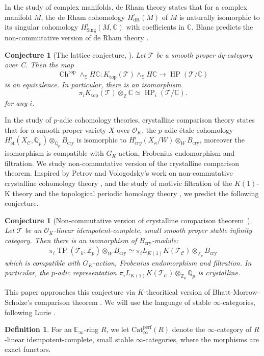 \documentclass[11pt]{amsart}
\newcommand{\bC}{\mathbb{C}}
\newcommand{\Q}{\mathbb{Q}}
\newcommand{\Z}{\mathbb{Z}}
\newcommand{\sC}{\mathcal{C}}
\newcommand{\sO}{\mathcal{O}}
\newcommand{\sT}{\mathcal{T}}
\newcommand{\bS}{\mathbb{S}}
\newcommand{\LK}{{L_{K(1)}}}
\newcommand{\TP}{\operatorname{TP}}
\newcommand{\HP}{\operatorname{HP}}
\newcommand{\et}{{\operatorname{\acute{e}t}}}
\newcommand{\Bcry}{B_{\operatorname{cry}}}
\newcommand{\Cat}{\operatorname{Cat_{\infty}^{perf}}}
\newtheorem{conj}[lemma]{Conjecture}
\theoremstyle{definition}
\newtheorem{defn}[lemma]{Definition}
\theoremstyle{remark}
\numberwithin{equation}{section}
\begin{document}
 In the study of complex manifolds, de Rham theory states that for a complex manifold $M$, the de Rham cohomology $H^i_{\text{dR}}(M)$ of $M$ is naturally isomorphic to its singular cohomology $H^i_{\text{Sing}}(M,\bC)$ with coefficients in $\mathbb{C}$. Blanc predicts the non-commutative version of de Rham theory \cite[Conejcture 1.7]{Blanc}.
\begin{conj}[The lattice conjecture, \cite{Blanc}]\label{lattice}
Let $\sT$ be a smooth proper dg-category over C. Then the map 
\[
\operatorname{Ch}^{\operatorname{top}}\wedge_{\bS}H\bC:K_{\operatorname{top}}(\sT)\wedge_{\bS}H\bC \to \HP(\sT/\bC)
\]
is an equivalence. In particular, there is an isomorphism 
\[
\pi_iK_{\operatorname{top}}(\sT) \otimes_\Z \bC \simeq \HP_i(\sT/\bC).
\]
for any $i$.
\end{conj}
In the study of $p$-adic cohomology theories, crystalline comparison theory \cite{Falcrys} states that for a smooth proper variety $X$ over $\sO_K$, the $p$-adic \'etale cohomology $H^i_\et(X_\sC,\Q_p)\otimes_{\Q_p}\Bcry$ is isomorphic to $H^i_{cry}(X_\kappa/W)\otimes_{W}\Bcry$, moreover the isomorphism is compatible with $G_K$-action, Frobenius endomorphism and filtration. We study non-commutative version of the crystalline comparison theorem. Inspired by Petrov and Vologodsky's work on non-commutative crystalline cohomology theory \cite{petrov}, and the study of motivic filtration of the $K(1)$-K theory \cite{Thomason} and the topological periodic homology theory \cite{BMS2}, we predict the following conjecture.
\begin{conj}[Non-commutative version of crystalline comparison theorem~\cite{Falcrys}] \label{NCcryconj}
Let $\sT$ be an $\sO_K$-linear idempotent-complete, small smooth proper stable infinity category. Then there is an isomorphism of $\Bcry$-module:
\[
\pi_i\TP(\sT_k;\Z_p)\otimes_W \Bcry \simeq \pi_i \LK K(\sT_\sC)\otimes_{\Z_p}\Bcry
\]
which is compatible with $G_K$-action, Frobenius endomorphism and filtration. In particular, the $p$-adic representation $\pi_i\LK K(\sT_\sC)\otimes_{\Z_p}\Q_p$ is crystalline.
\end{conj}
This paper approaches this conjecture via $K$-theoritical version of Bhatt-Morrow-Scholze's comparison theorem \cite{BMS2}. We will use the language of stable $\infty$-categories, following Lurie \cite{Lurie17}.
\begin{defn}
 For an $\mathbb{E}_\infty$-ring $R$, we let $\Cat (R)$ denote the $\infty$-category of $R$-linear idempotent-complete, small stable $\infty$-categories, where the morphisms are exact functors. 
\end{defn}
\end{document}
